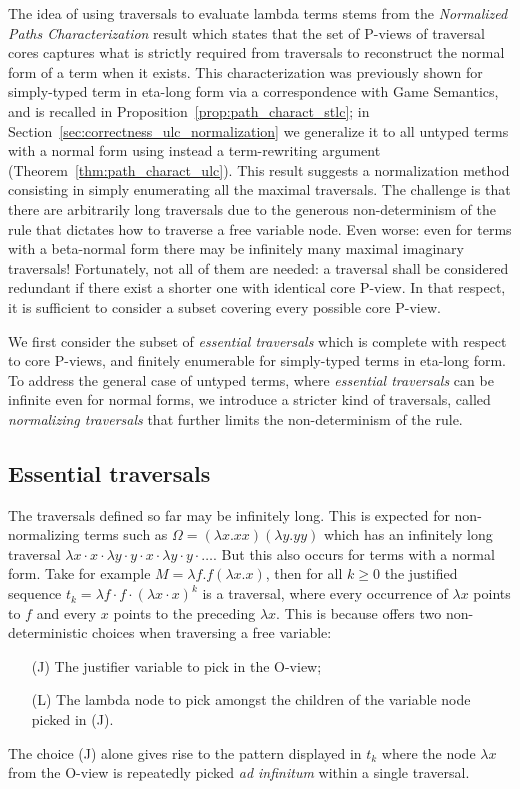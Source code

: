 \documentclass{elsarticle}
\theoremstyle{plain}
\theoremstyle{definition}
\theoremstyle{remark}
\begin{document}
The idea of using traversals to evaluate lambda terms stems from the \emph{Normalized Paths Characterization} result which states that the set of P-views of traversal cores captures what is strictly required from traversals to reconstruct the normal form of a term when it exists.
This characterization was previously shown for simply-typed term in eta-long form via
a correspondence with Game Semantics,
 and is recalled in Proposition~\ref{prop:path_charact_stlc};
 in Section~\ref{sec:correctness_ulc_normalization} we generalize it to all untyped terms with a normal form using instead a term-rewriting argument (Theorem~\ref{thm:path_charact_ulc}).
This result suggests a normalization method consisting in simply enumerating all the maximal traversals.
The challenge is that there are arbitrarily long traversals due to the generous non-determinism of the rule  that dictates how to traverse a free variable node.
Even worse: even for terms with a beta-normal form
there may be infinitely many maximal imaginary traversals!
Fortunately, not all of them are needed: a traversal shall be considered redundant if there exist a shorter one with identical core P-view.
In that respect, it is sufficient to consider a subset covering every possible core P-view.

We first consider the subset of \emph{essential traversals} which is complete with respect to core P-views, and finitely enumerable for simply-typed terms in eta-long form.
To address the general case of untyped terms,
where \emph{essential traversals} can be infinite even for normal forms, we introduce a stricter kind of traversals, called \emph{normalizing traversals} that further limits the non-determinism of the  rule.

\subsection{Essential traversals}

The traversals defined so far may be infinitely long. This is expected for non-normalizing terms such as $\Omega = (\lambda x. x x)(\lambda y. y y)$ which has an infinitely long traversal $\lambda x \cdot x \cdot \lambda y \cdot y \cdot x \cdot \lambda y \cdot y \cdot \ldots$. But this also occurs for terms with a normal form. Take for example $M = \lambda f . f (\lambda x. x)$, then for all $k\geq0$ the justified sequence $t_k = \lambda f \cdot f \cdot (\lambda x \cdot  x)^k$ is a traversal, where every occurrence of $\lambda x$ points to $f$ and every $x$ points to the preceding $\lambda x$.
This is because  offers two non-deterministic choices when traversing a free variable:
\begin{itemize}
\item[(J)] The justifier variable to pick in the O-view;
\item[(L)] The lambda node to pick amongst the children of the variable node picked in (J).
\end{itemize}
The choice (J) alone gives rise to the pattern displayed in $t_k$ where the node $\lambda x$ from the O-view is repeatedly picked {\it ad infinitum} within a single traversal.
\end{document}
